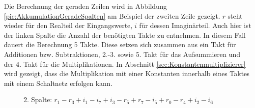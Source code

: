 Die Berechnung der geraden Zeilen wird in Abbildung \ref{pic:AkkumulationGeradeSpalten} am Beispiel der zweiten Zeile gezeigt.
$r$ steht wieder für den Realteil der Eingangswerte, $i$ für dessen Imaginärteil. 
Auch hier ist der linken Spalte die Anzahl der benötigten Takte zu entnehmen. In diesem Fall dauert die Berechnung 5 Takte. Diese setzen sich zusammen aus
ein Takt für Additionen bzw. Subtraktionen, 2.-3. sowie 5. Takt für das Aufsummieren und der 4. Takt für die Multiplikationen.
In Abschnitt \ref{sec:Konstantenmultiplizierer} wird gezeigt, dass die Multiplikation mit einer Konstanten innerhalb eines Taktes mit einem Schaltnetz erfolgen kann. 

\begin{figure}[htbp]
 \centering
 
2. Spalte:  $r_1 - r_3 + i_1 - i_7 + i_3 - r_5 + r_7 - i_5 + r_0 - r_4 + i_2 - i_6$
 

 \vspace{0.3cm}
 

\end{figure}
